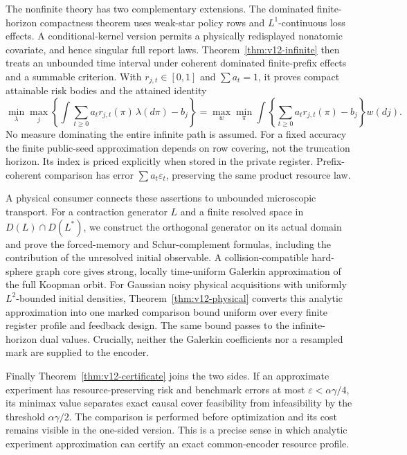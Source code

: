 The nonfinite theory has two complementary extensions. The dominated
finite-horizon compactness theorem uses weak-star policy rows and
$L^1$-continuous loss effects. A conditional-kernel version permits a
physically redisplayed nonatomic covariate, and hence singular full
report laws. Theorem~\ref{thm:v12-infinite} then treats an unbounded time
interval under coherent dominated finite-prefix effects and a summable
criterion. With $r_{j,t}\in[0,1]$ and $\sum a_t=1$, it proves compact
attainable risk bodies and the attained identity
\[
 \min_{\lambda}\max_j\left\{\int\sum_{t\ge0}a_t r_{j,t}(\pi)
                    \,\lambda(d\pi)-b_j\right\}
 =\max_w\min_\pi\int\left\{\sum_{t\ge0}a_t r_{j,t}(\pi)-b_j\right\}w(dj).
\]
No measure dominating the entire infinite path is assumed. For a fixed
accuracy the finite public-seed approximation depends on row covering,
not the truncation horizon. Its index is priced explicitly when stored
in the private register. Prefix-coherent comparison has error
$\sum a_t\varepsilon_t$, preserving the same product resource law.

A physical consumer connects these assertions to unbounded microscopic
transport. For a contraction generator $L$ and a finite resolved space
in $D(L)\cap D(L^*)$, we construct the orthogonal generator on its actual
domain and prove the forced-memory and Schur-complement formulas,
including the contribution of the unresolved initial observable. A
collision-compatible hard-sphere graph core gives strong, locally
time-uniform Galerkin approximation of the full Koopman orbit. For
Gaussian noisy physical acquisitions with uniformly $L^2$-bounded
initial densities, Theorem~\ref{thm:v12-physical} converts this analytic
approximation into one marked comparison bound uniform over every finite
register profile and feedback design. The same bound passes to the
infinite-horizon dual values. Crucially, neither the Galerkin coefficients
nor a resampled mark are supplied to the encoder.

Finally Theorem~\ref{thm:v12-certificate} joins the two sides. If an
approximate experiment has resource-preserving risk and benchmark errors
at most $\varepsilon<\alpha\gamma/4$, its minimax value separates exact
causal cover feasibility from infeasibility by the threshold
$\alpha\gamma/2$. The comparison is performed before optimization and
its cost remains visible in the one-sided version. This is a precise
sense in which analytic experiment approximation can certify an exact
common-encoder resource profile.

